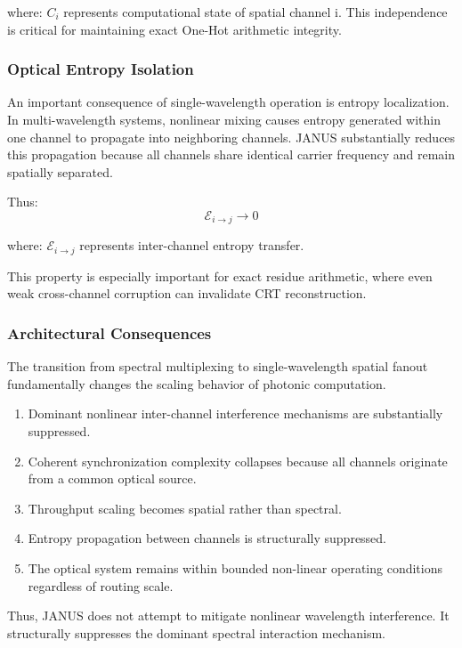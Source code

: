 \documentclass[journal]{IEEEtran}
\begin{document}
where: $C_i$ represents computational state of spatial channel i. This independence is critical for maintaining exact One-Hot arithmetic integrity.

\subsubsection{\textbf{Optical Entropy Isolation}}

An important consequence of single-wavelength operation is entropy localization. In multi-wavelength systems, nonlinear mixing causes entropy generated within one channel to propagate into neighboring channels. JANUS substantially reduces this propagation because all
channels share identical carrier frequency and remain spatially separated.

Thus:
\begin{equation}
\mathcal{E}_{i \rightarrow j} \rightarrow 0
\end{equation}

where: $\mathcal{E}_{i\rightarrow j}$ represents inter-channel entropy transfer.

This property is especially important for exact residue arithmetic, where even weak cross-channel corruption can invalidate CRT reconstruction.

\subsubsection{\textbf{Architectural Consequences}}

The transition from spectral multiplexing to single-wavelength spatial fanout fundamentally changes the scaling behavior of photonic computation.

\begin{enumerate}
\item Dominant nonlinear inter-channel interference mechanisms are substantially suppressed.
\item Coherent synchronization complexity collapses because all channels originate from a common optical source.
\item Throughput scaling becomes spatial rather than spectral.
\item Entropy propagation between channels is structurally suppressed.
\item The optical system remains within bounded non-linear operating conditions regardless of routing scale.
\end{enumerate}

Thus, JANUS does not attempt to mitigate nonlinear wavelength interference. It structurally suppresses the dominant spectral interaction
mechanism.
\end{document}
